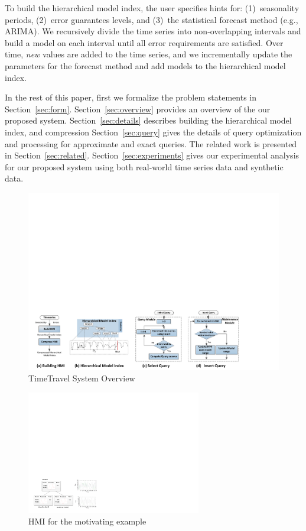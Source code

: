 \documentclass[10pt,conference,letterpaper]{IEEEtran}
\begin{document}
To build the hierarchical model index, the user specifies hints for: (1)~seasonality periods, (2)~error guarantees levels, and (3)~the statistical forecast method (e.g., ARIMA).  
We recursively divide the time series into non-overlapping intervals and build a model on each interval until all error requirements are satisfied. 
Over time, {\it new} values are added to the time series, and we incrementally update the parameters for the forecast method and add  models to the hierarchical model index.

In the rest of this paper, first we formalize the problem statements in Section~\ref{sec:form}.   Section~\ref{sec:overview} provides an overview of the our proposed system. Section~\ref{sec:details} describes building the hierarchical model index, and  compression Section~\ref{sec:query} gives the details of query optimization and processing for approximate and exact queries.  The  related work is presented in Section~\ref{sec:related}. Section~\ref{sec:experiments} gives  our experimental analysis for our proposed system   using  both real-world time series data and synthetic data.

\begin{figure}[th]
\center
\includegraphics[width=6in]{figs/overview3.pdf}
\caption{TimeTravel System Overview}
\label{fig:arch}
\end{figure} 
\begin{figure}[th]
\center
\includegraphics[width=3in]{figs/example_tree.pdf}
\caption{HMI for the motivating example}
\label{fig:exampletree}
\end{figure} 
\end{document}
